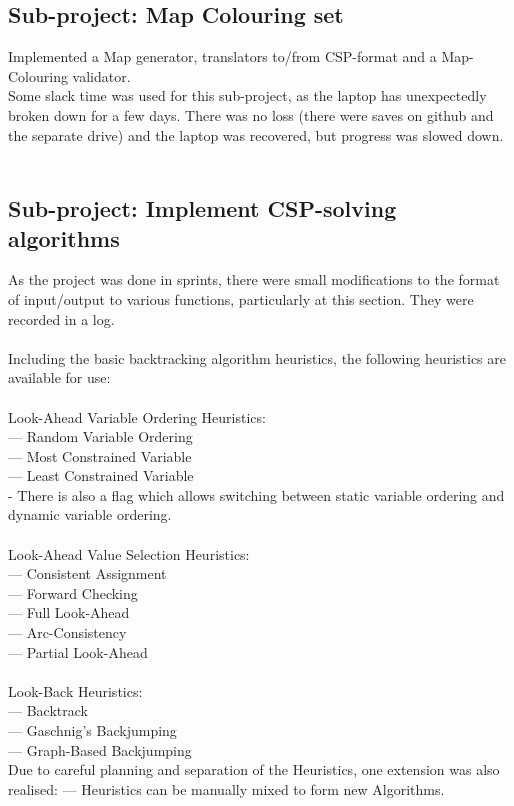 \documentclass[12pt,a4paper,twoside]{article}
\begin{document}
	\subsection*{Sub-project: Map Colouring set}
	Implemented a Map generator, translators to/from CSP-format and a Map-Colouring validator.\\
	Some slack time was used for this sub-project, as the laptop has unexpectedly broken down for a few days. There was no loss (there were saves on github and the separate drive) and the laptop was recovered, but progress was slowed down.\\\\
	\subsection*{Sub-project: Implement CSP-solving algorithms}
	As the project was done in sprints, there were small modifications to the format of input/output to various functions, particularly at this section. They were recorded in a log.\\\\
	Including the basic backtracking algorithm heuristics, the following heuristics are available for use:\\\\
	Look-Ahead Variable Ordering Heuristics:\\
	--- Random Variable Ordering\\
	--- Most Constrained Variable\\
	--- Least Constrained Variable\\
	- There is also a flag which allows switching between static variable ordering and dynamic variable ordering.\\\\
	Look-Ahead Value Selection Heuristics:\\
	--- Consistent Assignment\\
	--- Forward Checking\\
	--- Full Look-Ahead\\
	--- Arc-Consistency\\
	--- Partial Look-Ahead\\\\
	Look-Back Heuristics:\\
	--- Backtrack\\
	--- Gaschnig's Backjumping\\
	--- Graph-Based Backjumping\\
	
	Due to careful planning and separation of the Heuristics, one extension was also realised:
	--- Heuristics can be manually mixed to form new Algorithms.\\
	
\end{document}

